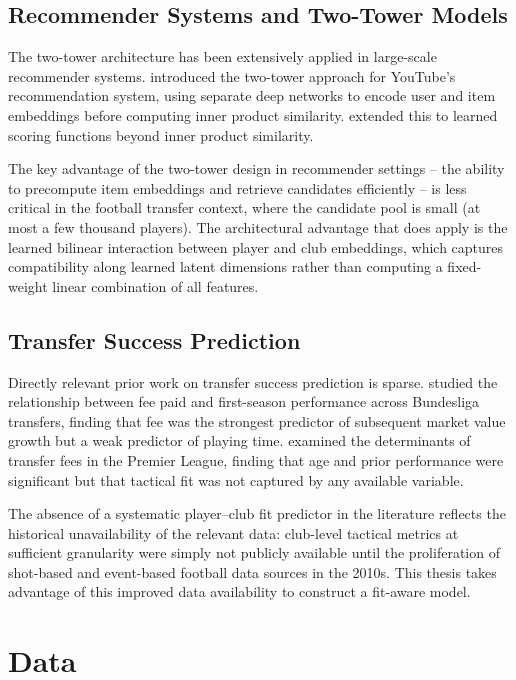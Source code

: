 \documentclass[12pt, a4paper, oneside]{report}
\begin{document}
\section{Recommender Systems and Two-Tower Models}

The two-tower architecture has been extensively applied in large-scale recommender systems. \citet{covington2016} introduced the two-tower approach for YouTube's recommendation system, using separate deep networks to encode user and item embeddings before computing inner product similarity. \citet{yi2019} extended this to learned scoring functions beyond inner product similarity.

The key advantage of the two-tower design in recommender settings -- the ability to precompute item embeddings and retrieve candidates efficiently -- is less critical in the football transfer context, where the candidate pool is small (at most a few thousand players). The architectural advantage that does apply is the learned bilinear interaction between player and club embeddings, which captures compatibility along learned latent dimensions rather than computing a fixed-weight linear combination of all features.

\section{Transfer Success Prediction}

Directly relevant prior work on transfer success prediction is sparse. \citet{transfer_success_herm} studied the relationship between fee paid and first-season performance across Bundesliga transfers, finding that fee was the strongest predictor of subsequent market value growth but a weak predictor of playing time. \citet{Carmichael2011} examined the determinants of transfer fees in the Premier League, finding that age and prior performance were significant but that tactical fit was not captured by any available variable.

The absence of a systematic player--club fit predictor in the literature reflects the historical unavailability of the relevant data: club-level tactical metrics at sufficient granularity were simply not publicly available until the proliferation of shot-based and event-based football data sources in the 2010s. This thesis takes advantage of this improved data availability to construct a fit-aware model.

\chapter{Data}
\label{chap:data}
\end{document}
